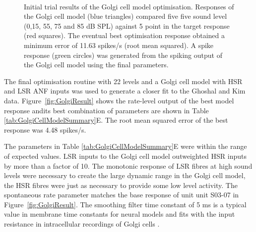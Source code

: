 \begin{figure}[htb]
  \centering
  \\
  \caption{Initial trial results of the Golgi cell model optimisation.
    Responses of the Golgi cell model (blue triangles) compared five five sound
    level (0,15, 55, 75 and 85 dB SPL) against 5 point in the target response
    (red squares). The eventual best optimisation response obtained a minimum
    error of 11.63 spikes/s (root mean squared). A spike response (green
    circles) was generated from the spiking output of the Golgi cell model using
    the final parameters.  }\label{fig:GolgiTestResult}
\end{figure}

The final optimisation routine with 22 levels and a Golgi cell model with HSR
and LSR ANF inputs was used to generate a closer fit to the Ghoshal and Kim
data. Figure~\ref{fig:GolgiResult} shows the rate-level output of the best model
response andits best combination of parameters are shown in Table
\ref{tab:GolgiCellModelSummary}E. The root mean squared error of the best
response was 4.48 spikes/s.

The parameters in Table \ref{tab:GolgiCellModelSummary}E were within the range
of expected values. LSR inputs to the Golgi cell model outweighted HSR inputs by
more than a factor of 10. The monotonic response of LSR fibres at high sound
levels were necessary to create the large dynamic range in the Golgi cell model,
the HSR fibres were just as necessary to provide some low level activity. The
spontaneous rate parameter matches the base response of unit unit S03-07 in
Figure~\ref{fig:GolgiResult}. The smoothing filter time constant of 5 ms is a
typical value in membrane time constants for neural models and fits with the
input resistance in intracellular recordings of  Golgi cells
\citep{FerragamoGoldingEtAl:1998}.
  


